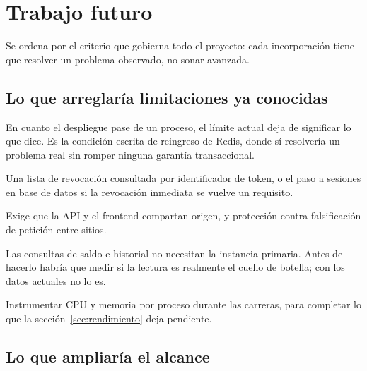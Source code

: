 \section{Trabajo futuro}
\label{sec:futuro}

Se ordena por el criterio que gobierna todo el proyecto: cada incorporación
tiene que resolver un problema observado, no sonar avanzada.

\subsection{Lo que arreglaría limitaciones ya conocidas}

\begin{description}[leftmargin=0.6cm,style=nextline]
  \item[Contador de limitación compartido.] En cuanto el despliegue pase de un
    proceso, el límite actual deja de significar lo que dice. Es la condición
    escrita de reingreso de Redis, donde sí resolvería un problema real sin
    romper ninguna garantía transaccional.
  \item[Revocación de tokens.] Una lista de revocación consultada por
    identificador de token, o el paso a sesiones en base de datos si la
    revocación inmediata se vuelve un requisito.
  \item[Cookie \codigo{httpOnly} para el navegador.] Exige que la API y el
    frontend compartan origen, y protección contra falsificación de petición
    entre sitios.
  \item[Réplica de lectura.] Las consultas de saldo e historial no necesitan
    la instancia primaria. Antes de hacerlo habría que medir si la lectura es
    realmente el cuello de botella; con los datos actuales no lo es.
  \item[Medición de recursos.] Instrumentar CPU y memoria por proceso durante
    las carreras, para completar lo que la sección~\ref{sec:rendimiento} deja
    pendiente.
\end{description}

\subsection{Lo que ampliaría el alcance}

